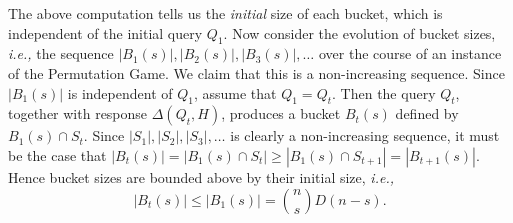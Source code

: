 \documentclass[12pt, a4paper]{article}
\newcommand{\intersect}{\cap}         %
\begin{document}
	The above computation tells us the \textit{initial} size of each bucket, which is independent of the initial query $Q_1$. Now consider the evolution of bucket sizes, \textit{i.e.,} the sequence $|B_1(s)|, |B_2(s)|, |B_3(s)|, \ldots$ over the course of an instance of the Permutation Game. We claim that this is a non-increasing sequence. Since $|B_1(s)|$ is independent of $Q_1$, assume that $Q_1 = Q_t$. Then the query $Q_t$, together with response $\Delta(Q_t, H)$, produces a bucket $B_t(s)$ defined by $B_1(s)\intersect S_t$. Since $|S_1|, |S_2|, |S_3|, \ldots$ is clearly a non-increasing sequence, it must be the case that $|B_{t}(s)| = |B_{1}(s)\intersect S_{t}|\ge |B_{1}(s)\intersect S_{t+1}| = |B_{t+1}(s)|$. Hence bucket sizes are bounded above by their initial size, \textit{i.e.,}
	\begin{equation*}
		|B_t(s)|\le |B_1(s)| = \binom{n}{s}D(n-s).
	\end{equation*}
\end{document}
